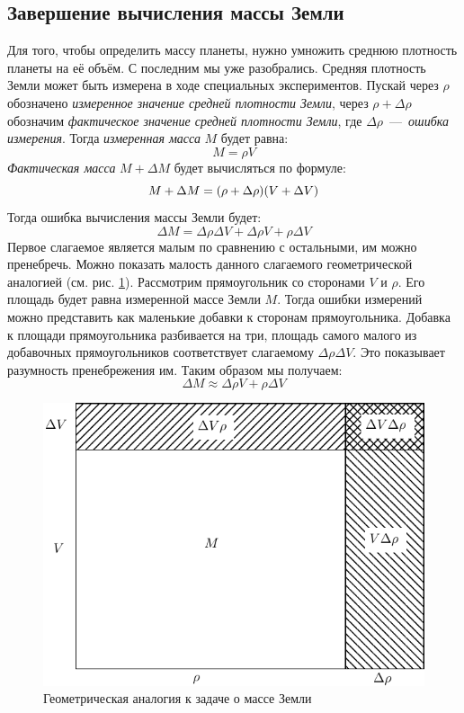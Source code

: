 \documentclass[titlepage]{article}
\begin{document}
\subsection{Завершение вычисления массы Земли}
Для того, чтобы определить массу планеты, нужно умножить среднюю плотность планеты на её объём. С последним мы уже разобрались. Средняя плотность Земли может быть измерена в ходе специальных экспериментов. Пускай через $\rho$ обозначено \emph{измеренное значение средней плотности Земли}, через $\rho + \Delta \rho$ обозначим \emph{фактическое значение средней плотности Земли}, где $\Delta \rho$~\----~\emph{ошибка измерения}. Тогда \emph{измеренная масса} $M$ будет равна:
\begin{equation}
 M = \rho V
\end{equation}
\emph{Фактическая масса} $M + \Delta M$ будет вычисляться по формуле:
\begin{equation}
 M + \Delta M = \qty(\rho + \Delta \rho) \qty(V + \Delta V)
\end{equation}
Тогда ошибка вычисления массы Земли будет:
\begin{equation}
 \Delta M = \Delta \rho \Delta V + \Delta \rho V + \rho \Delta V 
\end{equation}
Первое слагаемое является малым по сравнению с остальными, им можно пренебречь. Можно показать малость данного слагаемого геометрической аналогией (см. рис. \ref{fig:5}). Рассмотрим прямоугольник со сторонами $V$ и $\rho$. Его площадь будет равна измеренной массе Земли $M$. Тогда ошибки измерений можно представить как маленькие добавки к сторонам прямоугольника. Добавка к площади прямоугольника разбивается на три, площадь самого малого из добавочных прямоугольников соответствует слагаемому $\Delta \rho \Delta V$. Это показывает разумность пренебрежения им. Таким образом мы получаем:
\begin{equation}\label{eq:14}
 \Delta M \approx \Delta \rho V + \rho \Delta V 
\end{equation}
\begin{figure}[h]
 \centering
 \includegraphics[scale = 0.8]{first4.pdf}
 \caption{Геометрическая аналогия к задаче о массе Земли}
 \label{fig:5}
\end{figure}
\end{document}
